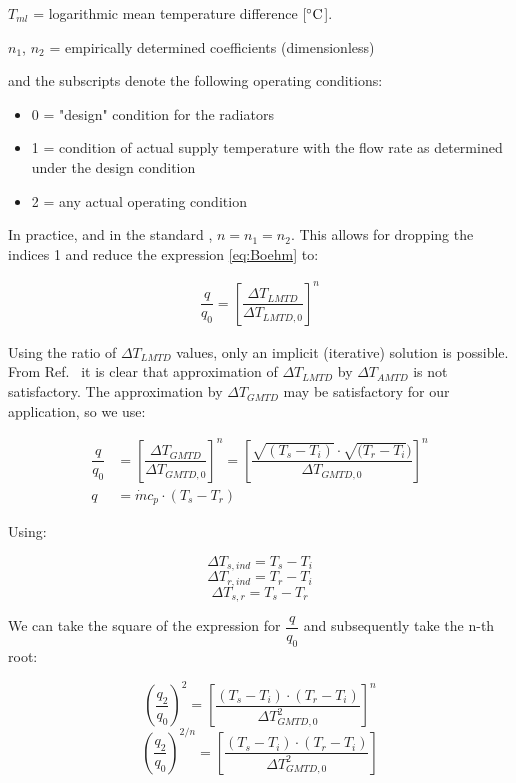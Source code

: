 $T_{ml}$ = logarithmic mean temperature difference [$^\circ\mathrm{C}$].

$n_1$, $n_2$ = empirically determined coefficients (dimensionless)

and the subscripts denote the following operating conditions:
\begin{itemize} %
	\item[] 0 = "design" condition for the radiators
	\item[] 1 = condition of actual supply temperature with the flow rate as determined under the design condition
	\item[] 2 = any actual operating condition
\end{itemize}


In practice, and in the standard \cite{NEN442}, $n = n_1 = n_2$. This allows for dropping the indices  1 and reduce the expression \ref{eq:Boehm} to:

\begin{equation}
	\begin{aligned}
		\dfrac{q}{q_0} = \left[\dfrac{\Delta T_{LMTD}}{\Delta T_{LMTD,0}}\right]^{n}
	\end{aligned}
	\label{eq:Boehm442}
\end{equation}

Using the ratio of $\Delta T_{LMTD}$ values, only an implicit (iterative) solution is possible. From Ref.~\cite{} it is clear that approximation of $\Delta T_{LMTD}$ by $\Delta T_{AMTD}$ is not satisfactory. The approximation by $\Delta T_{GMTD}$ may be satisfactory for our application, so we use:

\begin{equation}
	\begin{aligned}
		\dfrac{q}{q_0} &= \left[\dfrac{\Delta T_{GMTD}}{\Delta T_{GMTD,0}}\right]^{n} = \left[\dfrac{\sqrt{(T_s - T_{i})} \cdot  \sqrt{(T_r - T_{i}})}{\Delta T_{GMTD,0}}\right]^{n} \\
		q &= \dot{m} c_p \cdot (T_s - T_r)
	\end{aligned}
	\label{eq:BoehmGMTD}
\end{equation}

Using:

$$ \Delta T_{s,ind} = T_s - T_i $$
$$ \Delta T_{r,ind} = T_r - T_i $$
$$ \Delta T_{s,r} = T_s - T_r $$

We can take the square of the expression for $\dfrac{q}{q_0}$  and subsequently take the n-th root: 

$$ \left(\dfrac{q_2}{q_0}\right)^2 = \left[\dfrac{(T_s - T_{i}) \cdot  (T_r - T_{i})}{\Delta T_{GMTD,0}^2}\right]^{n} $$
$$ \left(\dfrac{q_2}{q_0}\right)^{2/n} = \left[\dfrac{(T_s - T_{i}) \cdot  (T_r - T_{i})}{\Delta T_{GMTD,0}^2}\right] $$

